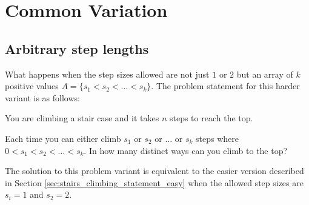 \section{Common Variation
}
\subsection{Arbitrary step lengths}
\label{stairs_climbing:sec:arbitrary_steps}
What happens when the step sizes allowed are not just $1$ or $2$ but an array of $k$ positive values $A=\{s_1 < s_2 < \ldots < s_k\}$. The problem statement for this harder variant is as follows:

\begin{exercise}
You are climbing a stair case and it takes $n$ steps to reach the top.

Each time you can either climb $s_1$ or $s_2$ or $\ldots$ or $s_k$ steps where $0 < s_1 < s_2 < \ldots < s_k$. In how many distinct ways can you climb to the top?
\end{exercise}

The solution to this problem variant is equivalent to the easier version described in Section \ref{sec:stairs_climbing_statement_easy} when the allowed step sizes are $s_i = 1$ and $s_2=2$.

